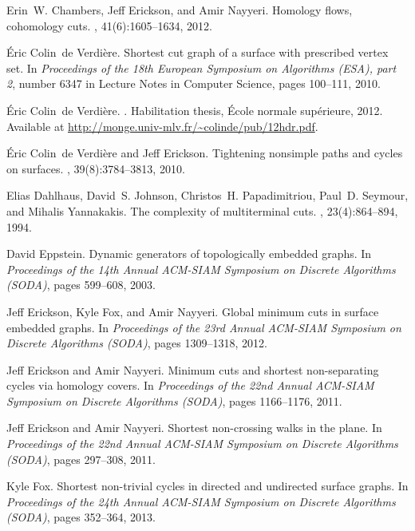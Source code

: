 \documentclass[11pt]{article}
\theoremstyle{plain}  \newtheorem{theorem}{Theorem}[section]
\theoremstyle{definition}
\begin{document}
\begin{thebibliography}{10}
Erin~W. Chambers, Jeff Erickson, and Amir Nayyeri.
\newblock Homology flows, cohomology cuts.
, 41(6):1605--1634, 2012.

{\'E}ric Colin~de Verdi{\`e}re.
\newblock Shortest cut graph of a surface with prescribed vertex set.
\newblock In {\em Proceedings of the 18th European Symposium on Algorithms
  (ESA), part 2}, number 6347 in Lecture Notes in Computer Science, pages
  100--111, 2010.

{\'E}ric Colin~de Verdi{\`e}re.
.
\newblock Habilitation thesis, {\'E}cole normale sup{\'e}rieure, 2012.
\newblock Available at \url{http://monge.univ-mlv.fr/~colinde/pub/12hdr.pdf}.

{\'E}ric Colin~de Verdi{\`e}re and Jeff Erickson.
\newblock Tightening nonsimple paths and cycles on surfaces.
, 39(8):3784--3813, 2010.

Elias Dahlhaus, David~S. Johnson, Christos~H. Papadimitriou, Paul~D. Seymour,
  and Mihalis Yannakakis.
\newblock The complexity of multiterminal cuts.
, 23(4):864--894, 1994.

David Eppstein.
\newblock Dynamic generators of topologically embedded graphs.
\newblock In {\em Proceedings of the 14th Annual ACM-SIAM Symposium on Discrete
  Algorithms (SODA)}, pages 599--608, 2003.

Jeff Erickson, Kyle Fox, and Amir Nayyeri.
\newblock Global minimum cuts in surface embedded graphs.
\newblock In {\em Proceedings of the 23rd Annual ACM-SIAM Symposium on Discrete
  Algorithms (SODA)}, pages 1309--1318, 2012.

Jeff Erickson and Amir Nayyeri.
\newblock Minimum cuts and shortest non-separating cycles via homology covers.
\newblock In {\em Proceedings of the 22nd Annual ACM-SIAM Symposium on Discrete
  Algorithms (SODA)}, pages 1166--1176, 2011.

Jeff Erickson and Amir Nayyeri.
\newblock Shortest non-crossing walks in the plane.
\newblock In {\em Proceedings of the 22nd Annual ACM-SIAM Symposium on Discrete
  Algorithms (SODA)}, pages 297--308, 2011.

Kyle Fox.
\newblock Shortest non-trivial cycles in directed and undirected surface
  graphs.
\newblock In {\em Proceedings of the 24th Annual ACM-SIAM Symposium on Discrete
  Algorithms (SODA)}, pages 352--364, 2013.


\end{thebibliography}
\end{document}
